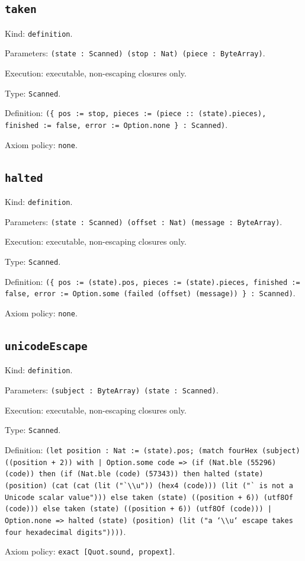 \documentclass[11pt]{article}
\begin{document}
\subsection*{\texttt{taken}}
\noindent Kind: \texttt{definition}.\par
\noindent Parameters: \texttt{(state : Scanned) (stop : Nat) (piece : ByteArray)}.\par
\noindent Execution: executable, non-escaping closures only.\par
\noindent Type: \texttt{Scanned}.\par
\noindent Definition: \texttt{(\{ pos := stop, pieces := (piece :: (state).pieces), finished := false, error := Option.none \} : Scanned)}.\par
\noindent Axiom policy: \texttt{none}.\par
\subsection*{\texttt{halted}}
\noindent Kind: \texttt{definition}.\par
\noindent Parameters: \texttt{(state : Scanned) (offset : Nat) (message : ByteArray)}.\par
\noindent Execution: executable, non-escaping closures only.\par
\noindent Type: \texttt{Scanned}.\par
\noindent Definition: \texttt{(\{ pos := (state).pos, pieces := (state).pieces, finished := false, error := Option.some (failed (offset) (message)) \} : Scanned)}.\par
\noindent Axiom policy: \texttt{none}.\par
\subsection*{\texttt{unicodeEscape}}
\noindent Kind: \texttt{definition}.\par
\noindent Parameters: \texttt{(subject : ByteArray) (state : Scanned)}.\par
\noindent Execution: executable, non-escaping closures only.\par
\noindent Type: \texttt{Scanned}.\par
\noindent Definition: \texttt{(let position : Nat := (state).pos; (match fourHex (subject) ((position + 2)) with | Option.some code => (if (Nat.ble (55296) (code)) then (if (Nat.ble (code) (57343)) then halted (state) (position) (cat (cat (lit ("`\textbackslash{}\textbackslash{}u")) (hex4 (code))) (lit ("` is not a Unicode scalar value"))) else taken (state) ((position + 6)) (utf8Of (code))) else taken (state) ((position + 6)) (utf8Of (code))) | Option.none => halted (state) (position) (lit ("a `\textbackslash{}\textbackslash{}u` escape takes four hexadecimal digits"))))}.\par
\noindent Axiom policy: \texttt{exact [Quot.sound, propext]}.\par
\end{document}
